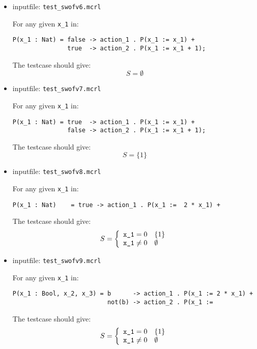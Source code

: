 \documentclass[a4paper,10pt]{article}
\begin{document}
\begin{itemize}
\item inputfile: \verb"test_swofv6.mcrl" 
\begin{tcase}
For any given \verb"x_1" in:
\begin{verbatim}
P(x_1 : Nat) = false -> action_1 . P(x_1 := x_1) +
               true  -> action_2 . P(x_1 := x_1 + 1);
\end{verbatim}
The testcase should give:
$$ S = \emptyset $$
\end{tcase}

\item inputfile: \verb"test_swofv7.mcrl" 
\begin{tcase}
For any given \verb"x_1" in:
\begin{verbatim}
P(x_1 : Nat) = true  -> action_1 . P(x_1 := x_1) +
               false -> action_2 . P(x_1 := x_1 + 1);
\end{verbatim}
The testcase should give:
$$ S = \lbrace 1 \rbrace $$
\end{tcase}

\item inputfile: \verb"test_swofv8.mcrl" 
\begin{tcase}
For any given \verb"x_1" in:
\begin{verbatim}
P(x_1 : Nat)	= true -> action_1 . P(x_1 :=  2 * x_1) +
\end{verbatim}
The testcase should give:
\begin{displaymath}
    S = \left\{
        \begin{array}{l l}
            \verb"x_1" = 0                      & \lbrace 1 \rbrace \\
            \verb"x_1" \neq 0                   & \emptyset \\
        \end{array} \right.
\end{displaymath}
\end{tcase}

\item inputfile: \verb"test_swofv9.mcrl" 
\begin{tcase}
For any given \verb"x_1" in:
\begin{verbatim}
P(x_1 : Bool, x_2, x_3) = b      -> action_1 . P(x_1 := 2 * x_1) +
                          not(b) -> action_2 . P(x_1 :=  
\end{verbatim}
The testcase should give:
\begin{displaymath}
    S = \left\{
        \begin{array}{l l}
            \verb"x_1" = 0                      & \lbrace 1 \rbrace \\
            \verb"x_1" \neq 0                   & \emptyset \\
        \end{array} \right.
\end{displaymath}
\end{tcase}

\end{itemize}
\end{document}
